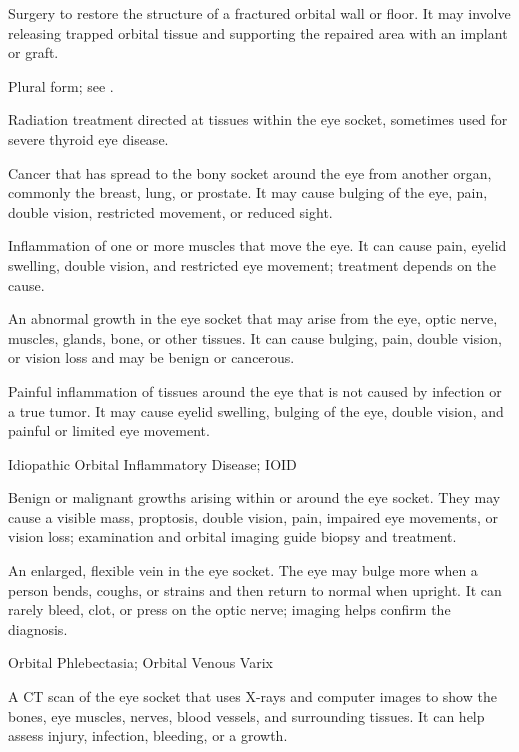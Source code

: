  Surgery to restore the structure of a fractured orbital wall or floor. It may involve releasing trapped orbital tissue and supporting the repaired area with an implant or graft.

 Plural form; see .

 Radiation treatment directed at tissues within the eye socket, sometimes used for severe thyroid eye disease.

 Cancer that has spread to the bony socket around the eye from another organ, commonly the breast, lung, or prostate. It may cause bulging of the eye, pain, double vision, restricted movement, or reduced sight.

 Inflammation of one or more muscles that move the eye. It can cause pain, eyelid swelling, double vision, and restricted eye movement; treatment depends on the cause.

 An abnormal growth in the eye socket that may arise from the eye, optic nerve, muscles, glands, bone, or other tissues. It can cause bulging, pain, double vision, or vision loss and may be benign or cancerous.

 Painful inflammation of tissues around the eye that is not caused by infection or a true tumor. It may cause eyelid swelling, bulging of the eye, double vision, and painful or limited eye movement.

\synonyms
Idiopathic Orbital Inflammatory Disease; IOID

 Benign or malignant growths arising within or around the eye socket. They may cause a visible mass, proptosis, double vision, pain, impaired eye movements, or vision loss; examination and orbital imaging guide biopsy and treatment.

 An enlarged, flexible vein in the eye socket. The eye may bulge more when a person bends, coughs, or strains and then return to normal when upright. It can rarely bleed, clot, or press on the optic nerve; imaging helps confirm the diagnosis.

\synonyms
Orbital Phlebectasia; Orbital Venous Varix

 A CT scan of the eye socket that uses X-rays and computer images to show the bones, eye muscles, nerves, blood vessels, and surrounding tissues. It can help assess injury, infection, bleeding, or a growth.

